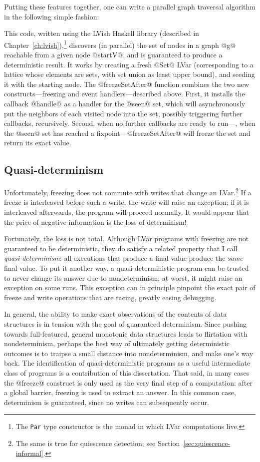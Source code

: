 Putting these features together, one can write a parallel graph
traversal algorithm in the following simple fashion:



This code, written using the LVish Haskell library (described in
Chapter~\ref{ch:lvish}),\footnote{The \lstinline|Par| type constructor
  is the monad in which LVar computations live.}  discovers (in
parallel) the set of nodes in a graph @g@ reachable from a given node
@startV@, and is guaranteed to produce a deterministic result.  It
works by creating a fresh @Set@ LVar (corresponding to a lattice whose
elements are sets, with set union as least upper bound), and seeding
it with the starting node.  The @freezeSetAfter@ function combines the
two new constructs---freezing and event handlers---described above.
First, it installs the callback @handle@ as a handler for the @seen@
set, which will asynchronously put the neighbors of each visited node
into the set, possibly triggering further callbacks, recursively.
Second, when no further callbacks are ready to run---\ie, when the
@seen@ set has reached a fixpoint---@freezeSetAfter@ will freeze the
set and return its exact value.

\subsection{Quasi-determinism}

Unfortunately, freezing does not commute with writes that change an
LVar.\footnote{The same is true for quiescence detection; see
  Section~\ref{sec:quiescence-informal}.}  If a freeze is interleaved
before such a write, the write will raise an exception; if it is
interleaved afterwards, the program will proceed normally.  It would
appear that the price of negative information is the loss of
determinism!

Fortunately, the loss is not total.  Although LVar programs with
freezing are not guaranteed to be deterministic, they do satisfy a
related property that I call \emph{quasi-determinism}: all executions
that produce a final value produce the \emph{same} final value.  To
put it another way, a quasi-deterministic program can be trusted to
never change its answer due to nondeterminism; at worst, it might
raise an exception on some runs.  This exception can in principle
pinpoint the exact pair of freeze and write operations that are
racing, greatly easing debugging.

In general, the ability to make exact observations of the contents of
data structures is in tension with the goal of guaranteed determinism.
Since pushing towards full-featured, general monotonic data structures
leads to flirtation with nondeterminism, perhaps the best way of
ultimately getting deterministic outcomes is to traipse a small
distance into nondeterminism, and make one's way back.  The
identification of quasi-deterministic programs as a useful
intermediate class of programs is a contribution of this dissertation.
That said, in many cases the @freeze@ construct is only used as the
very final step of a computation: after a global barrier, freezing is
used to extract an answer.  In this common case, determinism is
guaranteed, since no writes can subsequently occur.

